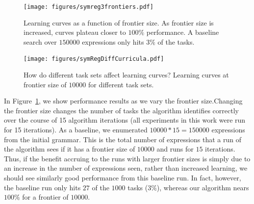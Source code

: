 \documentclass{article}
\begin{document}
\setcounter{subfigure}{0} 
\begin{figure}[ht]
\centering
\texttt{[image: figures/symreg3frontiers.pdf]}
\vspace{-.2cm}
\caption{Learning curves as a function of frontier size.  As frontier
  size is increased, curves plateau closer to $100\%$ performance. A
  baseline search over $150000$ expressions only hits $3\%$ of the
  tasks. \label{fig:symregLearning}}
\vspace{-.3cm}
\end{figure}
\begin{figure}[ht]
\texttt{[image: figures/symRegDiffCurricula.pdf]}
\caption{How do different task sets affect learning curves? Learning
  curves at frontier size of $10000$ for different task
  sets.} 
\label{fig:symregCurricula}

\end{figure}







In Figure~\ref{fig:symregLearning}, we show performance results as we
vary the frontier size.Changing the frontier size changes the number
of tasks the algorithm identifies correctly over the course of 15
algorithm iterations (all experiments in this work were run for 15
iterations). As a baseline, we enumerated $10000*15=150000$
expressions from the initial grammar. This is the total number of
expressions that a run of the algorithm sees if it has a frontier size
of $10000$ and runs for $15$ iterations. Thus, if the benefit accruing
to the runs with larger frontier sizes is simply due to an increase in
the number of expressions seen, rather than increased learning, we
should see similarly good performance from this baseline run. In fact,
however, the baseline run only hits $27$ of the $1000$ tasks ($3\%$),
whereas our algorithm nears $100\%$ for a frontier of $10000$.
\end{document}
